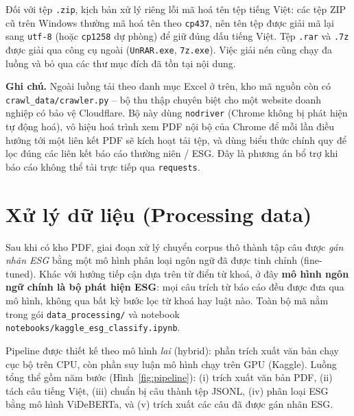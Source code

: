 \documentclass{article}
\begin{document}
Đối với tệp \texttt{.zip}, kịch bản xử lý riêng lỗi mã hoá tên tệp tiếng Việt:
các tệp ZIP cũ trên Windows thường mã hoá tên theo \texttt{cp437}, nên tên tệp
được giải mã lại sang \texttt{utf-8} (hoặc \texttt{cp1258} dự phòng) để giữ đúng
dấu tiếng Việt. Tệp \texttt{.rar} và \texttt{.7z} được giải qua công cụ ngoài
(\texttt{UnRAR.exe}, \texttt{7z.exe}). Việc giải nén cũng chạy đa luồng và bỏ qua
các thư mục đích đã tồn tại nội dung.

\medskip
\noindent\textbf{Ghi chú.} Ngoài luồng tải theo danh mục Excel ở trên, kho mã
nguồn còn có \texttt{crawl\_data/crawler.py} -- bộ thu thập chuyên biệt cho một
website doanh nghiệp có bảo vệ Cloudflare. Bộ này dùng \texttt{nodriver}
(Chrome không bị phát hiện tự động hoá), vô hiệu hoá trình xem PDF nội bộ của
Chrome để mỗi lần điều hướng tới một liên kết PDF sẽ kích hoạt tải tệp, và dùng
biểu thức chính quy để lọc đúng các liên kết báo cáo thường niên / ESG. Đây là
phương án bổ trợ khi báo cáo không thể tải trực tiếp qua \texttt{requests}.

\section{Xử lý dữ liệu (Processing data)}

Sau khi có kho PDF, giai đoạn xử lý chuyển corpus thô thành tập câu được
\textit{gán nhãn ESG} bằng một mô hình phân loại ngôn ngữ đã được tinh chỉnh
(fine-tuned). Khác với hướng tiếp cận dựa trên từ điển từ khoá, ở đây
\textbf{mô hình ngôn ngữ chính là bộ phát hiện ESG}: mọi câu trích từ báo cáo đều
được đưa qua mô hình, không qua bất kỳ bước lọc từ khoá hay luật nào. Toàn bộ mã
nằm trong gói \texttt{data\_processing/} và notebook
\texttt{notebooks/kaggle\_esg\_classify.ipynb}.

Pipeline được thiết kế theo mô hình \textit{lai} (hybrid): phần trích xuất văn
bản chạy cục bộ trên CPU, còn phần suy luận mô hình chạy trên GPU (Kaggle). Luồng
tổng thể gồm năm bước (Hình~\ref{fig:pipeline}): (i) trích xuất văn bản PDF,
(ii) tách câu tiếng Việt, (iii) chuẩn bị câu thành tệp JSONL, (iv) phân loại ESG
bằng mô hình ViDeBERTa, và (v) trích xuất các câu đã được gán nhãn ESG.
\end{document}
